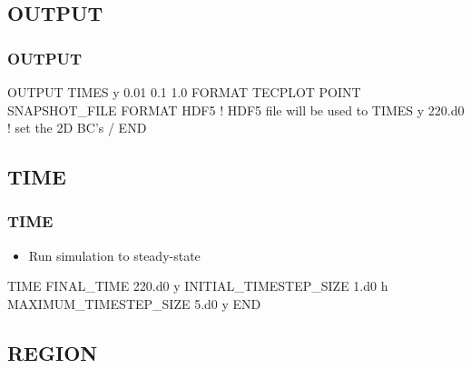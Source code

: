 \documentclass{beamer}
\newcommand\bluecomment[1]{{{\color{blue} #1}}}
\begin{document}
\subsection{OUTPUT}

\begin{frame}[fragile]\frametitle{OUTPUT}

\begin{semiverbatim}
OUTPUT
  TIMES y 0.01 0.1 1.0
  FORMAT TECPLOT POINT
  SNAPSHOT_FILE
    FORMAT HDF5 \bluecomment{! HDF5 file will be used to} 
    TIMES y 220.d0 \bluecomment{! set the 2D BC's}
  /
END
\end{semiverbatim}

\end{frame}

\subsection{TIME}

\begin{frame}[fragile]\frametitle{TIME}

\begin{itemize}
\item Run simulation to steady-state
\end{itemize}

\begin{semiverbatim}

TIME
  FINAL_TIME 220.d0 y
  INITIAL_TIMESTEP_SIZE 1.d0 h
  MAXIMUM_TIMESTEP_SIZE 5.d0 y
END

\end{semiverbatim}

\end{frame}

\subsection{REGION}
\end{document}

